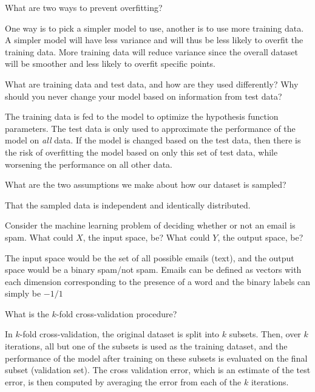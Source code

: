 \begin{problem}[2]
  What are two ways to prevent overfitting?
\end{problem}
\begin{solution}
  One way is to pick a simpler model to use, another is to use more training data. A simpler model will have less variance and will thus be less likely to overfit the training data. More training data will reduce variance since the overall dataset will be smoother and less likely to overfit specific points.
\end{solution}

\begin{problem}[2]
  What are training data and test data, and how are they used differently? Why should you never change your model based on information from test data?
\end{problem}
\begin{solution}
  The training data is fed to the model to optimize the hypothesis function parameters. The test data is only used to approximate the performance of the model on \emph{all} data. If the model is changed based on the test data, then there is the risk of overfitting the model based on only this set of test data, while worsening the performance on all other data.
\end{solution}

\newpage

\begin{problem}[2]
  What are the two assumptions we make about how our dataset is sampled?
\end{problem}
\begin{solution}
  That the sampled data is independent and identically distributed.
\end{solution}

\begin{problem}[2]
  Consider the machine learning problem of deciding whether or not an email is spam. What could $X$, the input space, be? What could $Y$, the output space, be?
\end{problem}
\begin{solution}
  The input space would be the set of all possible emails (text), and the output space would be a binary spam/not spam. Emails can be defined as vectors with each dimension corresponding to the presence of a word and the binary labels can simply be $-1/1$
\end{solution}

\begin{problem}[2]
  What is the $k$-fold cross-validation procedure?
\end{problem}
\begin{solution}
  In $k$-fold cross-validation, the original dataset is split into $k$ subsets. Then, over $k$ iterations, all but one of the subsets is used as the training dataset, and the performance of the model after training on these subsets is evaluated on the final subset (validation set). The cross validation error, which is an estimate of the test error, is then computed by averaging the error from each of the $k$ iterations.
\end{solution}



